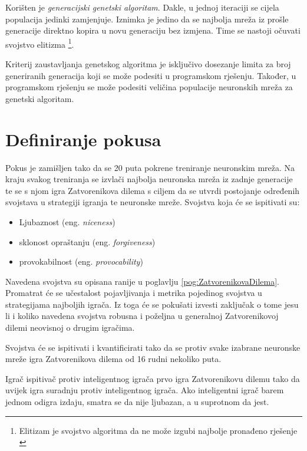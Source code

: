 \documentclass[zavrsnirad]{fer}
\begin{document}
		Korišten je \textit{generacijski genetski algoritam}. Dakle, u jednoj iteraciji se cijela populacija jedinki zamjenjuje. Iznimka je jedino da se najbolja mreža iz prošle generacije direktno kopira u novu generaciju bez izmjena. Time se nastoji očuvati svojstvo elitizma \footnote{Elitizam je svojstvo algoritma da ne može izgubi najbolje pronađeno rješenje \cite{skriptaEvolucijskoRacunarstvo}}. 
		
		Kriterij zaustavljanja genetskog algoritma je isključivo dosezanje limita za broj generiranih generacija koji se može podesiti u programskom rješenju. Također, u programskom rješenju se može podesiti veličina populacije neuronskih mreža za genetski algoritam.
	
\chapter{Definiranje pokusa}
\label{pog:Pokus}

	Pokus je zamišljen tako da se 20 puta pokrene treniranje neuronskim mreža. Na kraju svakog treniranja se izvlači najbolja neuronska mreža iz zadnje generacije te se s njom igra Zatvorenikova dilema s ciljem da se utvrdi postojanje određenih svojstava u strategiji igranja te neuronske mreže. Svojstva koja će se ispitivati su:
	\begin{itemize}
		\item Ljubaznost (eng. \textit{niceness})
		\item sklonost opraštanju (eng. \textit{forgiveness})
		\item provokabilnost (eng. \textit{provocability})
	\end{itemize}
	
	Navedena svojstva su opisana ranije u poglavlju \ref{pog:ZatvorenikovaDilema}. Promatrat će se učestalost pojavljivanja i metrika pojedinog svojstva u strategijama najboljih igrača. Iz toga će se pokušati izvesti zaključak o tome jesu li i koliko navedena svojstva robusna i poželjna u generalnoj Zatvorenikovoj dilemi neovisnoj o drugim igračima.
	
	Svojstva će se ispitivati i kvantificirati tako da se protiv svake izabrane neuronske mreže igra Zatvorenikova dilema od 16 rudni nekoliko puta. 
	
	Igrač ispitivač protiv inteligentnog igrača prvo igra Zatvorenikovu dilemu tako da uvijek igra suradnju protiv inteligentnog igrača. Ako inteligentni igrač barem jednom odigra izdaju, smatra se da nije ljubazan, a u suprotnom da jest. 
	
\end{document}
